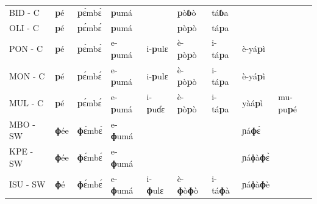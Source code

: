 \documentclass[output=paper,colorlinks,citecolor=brown
]{langscibook}
\begin{document}
\begin{table}
{\begin{tabular}{lllllllll}
BID - C                   & \textbf{p}é                     & \textbf{p}ɛ́mbɛ́                 & \textbf{p}umá                    &                        & \textbf{p}ò\textbf{ɓ}ò                & tá\textbf{ɓ}a                    &                          &                        \\
OLI - C                   & \textbf{p}é                     & \textbf{p}ɛ́mbɛ́                 & \textbf{p}umá                    &                        & \textbf{p}ò\textbf{p}ò                & tá\textbf{p}a                    &                          &                        \\
PON - C                   & \textbf{p}é                     & \textbf{p}ɛ́mbɛ́                 & e-\textbf{p}umá                  & i-\textbf{p}ulɛ                 & è-\textbf{p}ò\textbf{p}ò             & i-tá\textbf{p}a                  & è-yá\textbf{p}ì                  &                        \\
MON - C                   & \textbf{p}é                     & \textbf{p}ɛ́mbɛ́                 & e-\textbf{p}umá                  & i-\textbf{p}ulɛ                 & è-\textbf{p}ò\textbf{p}ò             & i-tá\textbf{p}a                  & è-yá\textbf{p}ì                  &                        \\
MUL - C                   & \textbf{p}é                     & \textbf{p}ɛ́mbɛ́                 & e-\textbf{p}umá                  & i-\textbf{p}uɗɛ                 & è-\textbf{p}ò\textbf{p}ò             & i-tá\textbf{p}a                  & yàá\textbf{p}ì                    & mu-pu\textbf{p}é                \\
MBO - SW                  & \textbf{ɸ}ée                    & \textbf{ɸ}ɛ́mbɛ́                 & e-\textbf{ɸ}umá                  &                        &                       &                         & ɲá\textbf{ɸ}ɛ̀                   &                        \\
KPE - SW                  & \textbf{ɸ}ée                    & \textbf{ɸ}ɛ́mbɛ́                 & e-\textbf{ɸ}umá                  &                        &                       &                         & ɲáɸà\textbf{ɸ}ɛ̀                &                        \\
ISU - SW                  & \textbf{ɸ}é                     & \textbf{ɸ}ɛ́mbɛ́                 & e-\textbf{ɸ}umá                  & i-\textbf{ɸ}ulɛ                 & è-\textbf{ɸ}ò\textbf{ɸ}ò             & i-tá\textbf{ɸ}à                & ɲáɸà\textbf{ɸ}è                &                        \\

\end{tabular}}
\end{table}
\end{document}
